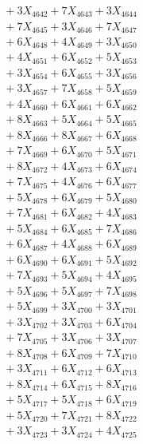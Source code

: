 \documentclass[a4paper,10pt]{article}
\begin{document}
{\begin{align}
&\;  + 3 X_{4642} + 7 X_{4643} + 3 X_{4644} \\[0.3ex]
&\;  + 7 X_{4645} + 3 X_{4646} + 7 X_{4647} \\[0.3ex]
&\;  + 6 X_{4648} + 4 X_{4649} + 3 X_{4650} \\[0.3ex]
&\;  + 4 X_{4651} + 6 X_{4652} + 5 X_{4653} \\[0.3ex]
&\;  + 3 X_{4654} + 6 X_{4655} + 3 X_{4656} \\[0.3ex]
&\;  + 3 X_{4657} + 7 X_{4658} + 5 X_{4659} \\[0.5ex]\allowbreak
&\;  + 4 X_{4660} + 6 X_{4661} + 6 X_{4662} \\[0.3ex]
&\;  + 8 X_{4663} + 5 X_{4664} + 5 X_{4665} \\[0.3ex]
&\;  + 8 X_{4666} + 8 X_{4667} + 6 X_{4668} \\[0.3ex]
&\;  + 7 X_{4669} + 6 X_{4670} + 5 X_{4671} \\[0.3ex]
&\;  + 8 X_{4672} + 4 X_{4673} + 6 X_{4674} \\[0.3ex]
&\;  + 7 X_{4675} + 4 X_{4676} + 6 X_{4677} \\[0.3ex]
&\;  + 5 X_{4678} + 6 X_{4679} + 5 X_{4680} \\[0.3ex]
&\;  + 7 X_{4681} + 6 X_{4682} + 4 X_{4683} \\[0.3ex]
&\;  + 5 X_{4684} + 6 X_{4685} + 7 X_{4686} \\[0.3ex]
&\;  + 6 X_{4687} + 4 X_{4688} + 6 X_{4689} \\[0.5ex]\allowbreak
&\;  + 6 X_{4690} + 6 X_{4691} + 5 X_{4692} \\[0.3ex]
&\;  + 7 X_{4693} + 5 X_{4694} + 4 X_{4695} \\[0.3ex]
&\;  + 5 X_{4696} + 5 X_{4697} + 7 X_{4698} \\[0.3ex]
&\;  + 5 X_{4699} + 3 X_{4700} + 3 X_{4701} \\[0.3ex]
&\;  + 3 X_{4702} + 3 X_{4703} + 6 X_{4704} \\[0.3ex]
&\;  + 7 X_{4705} + 3 X_{4706} + 3 X_{4707} \\[0.3ex]
&\;  + 8 X_{4708} + 6 X_{4709} + 7 X_{4710} \\[0.3ex]
&\;  + 3 X_{4711} + 6 X_{4712} + 6 X_{4713} \\[0.3ex]
&\;  + 8 X_{4714} + 6 X_{4715} + 8 X_{4716} \\[0.3ex]
&\;  + 5 X_{4717} + 5 X_{4718} + 6 X_{4719} \\[0.5ex]\allowbreak
&\;  + 5 X_{4720} + 7 X_{4721} + 8 X_{4722} \\[0.3ex]
&\;  + 3 X_{4723} + 3 X_{4724} + 4 X_{4725} \\[0.3ex]

\end{align}}
\end{document}
